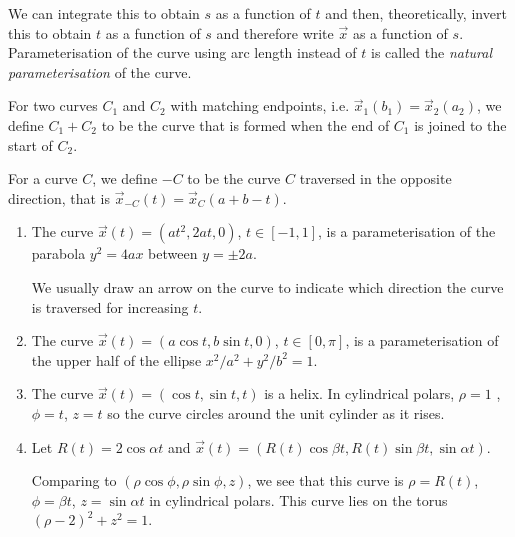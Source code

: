 \documentclass[../main.tex]{subfiles}
\begin{document}
We can integrate this to obtain $s$ as a function of $t$ and then, theoretically, invert this to obtain $t$ as a function of $s$ and therefore write $\vec{x}$ as a function of $s$.
Parameterisation of the curve using arc length instead of $t$ is called the \textit{natural parameterisation} of the curve.
\begin{definition}
  For two curves $C_1$ and $C_2$ with matching endpoints, i.e. $\vec{x}_1(b_1) = \vec{x}_2(a_2)$, we define $C_1 + C_2$ to be the curve that is formed when the end of $C_1$ is joined to the start of $C_2$.

  For a curve $C$, we define $-C$ to be the curve $C$ traversed in the opposite direction, that is $\vec{x}_{-C}(t) = \vec{x}_{C}(a + b - t)$.
\end{definition}
\begin{example}
  \begin{enumerate}
    \item The curve $\vec{x}(t) = (at^2, 2at, 0)$, $t \in [-1, 1]$, is a parameterisation of the parabola $y^2 = 4ax$ between $y = \pm2a$.
      \begin{center}
      \end{center}
      We usually draw an arrow on the curve to indicate which direction the curve is traversed for increasing $t$.
    \item The curve $\vec{x}(t) = (a \cos t, b \sin t, 0)$, $t \in [0, \pi]$, is a parameterisation of the upper half of the ellipse $x^2/a^2 + y^2/b^2 = 1$.
    \item The curve $\vec{x}(t) = (\cos t, \sin t, t)$ is a helix.
      In cylindrical polars, $\rho = 1$ , $\phi = t$, $z = t$ so the curve circles around the unit cylinder as it rises.
    \item Let $R(t) = 2 \cos \alpha t$ and $\vec{x}(t) = (R(t)\cos \beta t, R(t)\sin \beta t, \sin \alpha t)$.

      Comparing to $(\rho \cos \phi, \rho \sin \phi, z)$, we see that this curve is $\rho = R(t)$, $\phi = \beta t$, $z = \sin \alpha t$ in cylindrical polars.
      This curve lies on the torus $(\rho - 2)^2 + z^2 = 1$.
  \end{enumerate}
\end{example}
\end{document}
